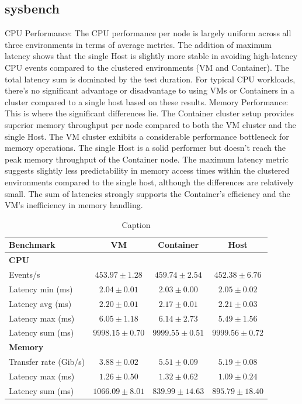 \subsection{sysbench}
CPU Performance: The CPU performance per node is largely uniform across all three environments in terms of average metrics. The addition of maximum latency shows that the single Host is slightly more stable in avoiding high-latency CPU events compared to the clustered environments (VM and Container). The total latency sum is dominated by the test duration. For typical CPU workloads, there's no significant advantage or disadvantage to using VMs or Containers in a cluster compared to a single host based on these results.
Memory Performance: This is where the significant differences lie. The Container cluster setup provides superior memory throughput per node compared to both the VM cluster and the single Host. The VM cluster exhibits a considerable performance bottleneck for memory operations. The single Host is a solid performer but doesn't reach the peak memory throughput of the Container node. The maximum latency metric suggests slightly less predictability in memory access times within the clustered environments compared to the single host, although the differences are relatively small. The sum of latencies strongly supports the Container's efficiency and the VM's inefficiency in memory handling.

\begin{table}[H]
    \centering
    \begin{tabular}{lccc}
    \toprule
    \textbf{Benchmark} & \textbf{VM} & \textbf{Container} & \textbf{Host} \\
    \midrule
    \textbf{CPU} & & & \\
    Events/s & $453.97 \pm 1.28$ & $459.74 \pm 2.54$ & $452.38 \pm 6.76$ \\
    Latency min (ms) & $2.04 \pm 0.01$ & $2.03 \pm 0.00$ & $2.05 \pm 0.02$ \\
    Latency avg (ms) & $2.20 \pm 0.01$ & $2.17 \pm 0.01$ & $2.21 \pm 0.03$ \\
    Latency max (ms) & $6.05 \pm 1.18$ & $6.14 \pm 2.73$ & $5.49 \pm 1.56$ \\
    Latency sum (ms) & $9998.15 \pm 0.70$ & $9999.55 \pm 0.51$ & $9999.56 \pm 0.72$ \\
    \midrule
    \textbf{Memory} & & & \\
    Transfer rate (Gib/s) & $3.88 \pm 0.02$ & $5.51 \pm 0.09$ & $5.19 \pm 0.08$ \\
    Latency max (ms) & $1.26 \pm 0.50$ & $1.32 \pm 0.62$ & $1.09 \pm 0.24$ \\
    Latency sum (ms) & $1066.09 \pm 8.01$ & $839.99 \pm 14.63$ & $895.79 \pm 18.40$ \\
    \bottomrule

    \end{tabular}
    \caption{Caption}
    \label{tab:sysbench}
\end{table}


